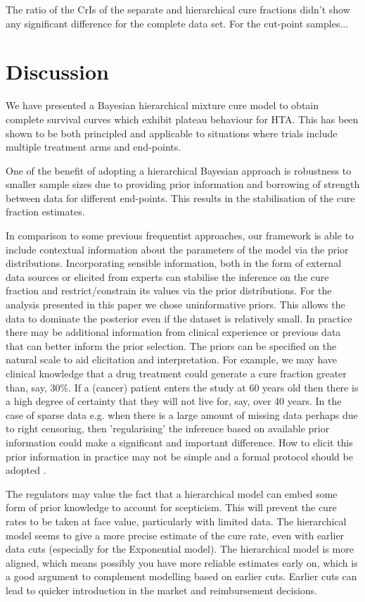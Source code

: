 \documentclass[AMA,STIX1COL]{WileyNJD-v2}
\begin{document}
The ratio of the CrIs of the separate and hierarchical cure fractions didn't show any significant difference for the complete data set.
For the cut-point samples...




\section{Discussion}\label{sec:discussion}
We have presented a Bayesian hierarchical mixture cure model to obtain complete survival curves which exhibit plateau behaviour for HTA.
This has been shown to be both principled and applicable to situations where trials include multiple treatment arms and end-points.

One of the benefit of adopting a hierarchical Bayesian approach is robustness to smaller sample sizes due to providing prior information and borrowing of strength between data for different end-points.
This results in the stabilisation of the cure fraction estimates.

In comparison to some previous frequentist approaches, our framework is able to include contextual information about the parameters of the model via the prior distributions.
Incorporating sensible information, both in the form of external data sources or elicited from experts can
stabilise the inference on the cure fraction and restrict/constrain its values via the prior distributions.
For the analysis presented in this paper we chose uninformative priors.
This allows the data to dominate the posterior even if the dataset is relatively small.
In practice there may be additional information from clinical experience or previous data that can better inform the prior selection.
The priors can be specified on the natural scale to aid elicitation and interpretation.
For example, we may have clinical knowledge that a drug treatment could generate a cure fraction greater than, say, 30\%.
If a (cancer) patient enters the study at 60 years old then there is a high degree of certainty that they will not live for, say, over 40 years.
In the case of sparse data e.g. when there is a large amount of missing data perhaps due to right censoring, then 'regularising' the inference based on available prior information could make a significant and important difference.
How to elicit this prior information in practice may not be simple and a formal protocol should be adopted \cite{OHagan2019}.


The regulators may value the fact that a hierarchical model can embed some form of prior knowledge to account for scepticism.
This will prevent the cure rates to be taken at face value, particularly with limited data.
The hierarchical model seems to give a more precise estimate of the cure rate, even with earlier data cuts (especially for the Exponential model).
The hierarchical model is more aligned, which means possibly you have more reliable estimates early on, which is a good argument to complement modelling based on earlier cuts.
Earlier cuts can lead to quicker introduction in the market and reimbursement decisions.
\end{document}
